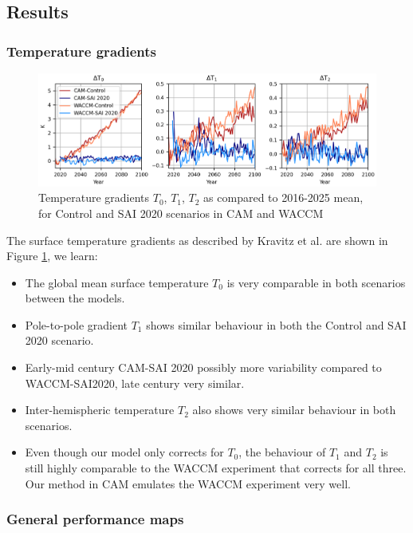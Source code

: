 \subsection{Results}
\subsubsection{Temperature gradients}

\begin{figure}[H]
	\centering
	\includegraphics[width=\linewidth]{../Paper_imgs/Tgrad_2.png}
	\caption{Temperature gradients $T_0$, $T_1$, $T_2$ as compared to 2016-2025 mean, for Control and SAI 2020 scenarios in CAM and WACCM}
	\label{fig:Tgrad}
\end{figure}

The surface temperature gradients as described by Kravitz et al. are shown in Figure \ref{fig:Tgrad}, we learn:
\begin{itemize}
	\item The global mean surface temperature $T_0$ is very comparable in both scenarios between the models.
	\item Pole-to-pole gradient $T_1$ shows similar behaviour in both the Control and SAI 2020 scenario.
	\item Early-mid century CAM-SAI 2020 possibly more variability compared to WACCM-SAI2020, late century very similar.
	\item Inter-hemispheric temperature $T_2$ also shows very similar behaviour in both scenarios. 
	
	\item Even though our model only corrects for $T_0$, the behaviour of $T_1$ and $T_2$ is still highly comparable to the WACCM experiment that corrects for all three. Our method in CAM emulates the WACCM experiment very well. 
\end{itemize}

\subsubsection{General performance maps}

